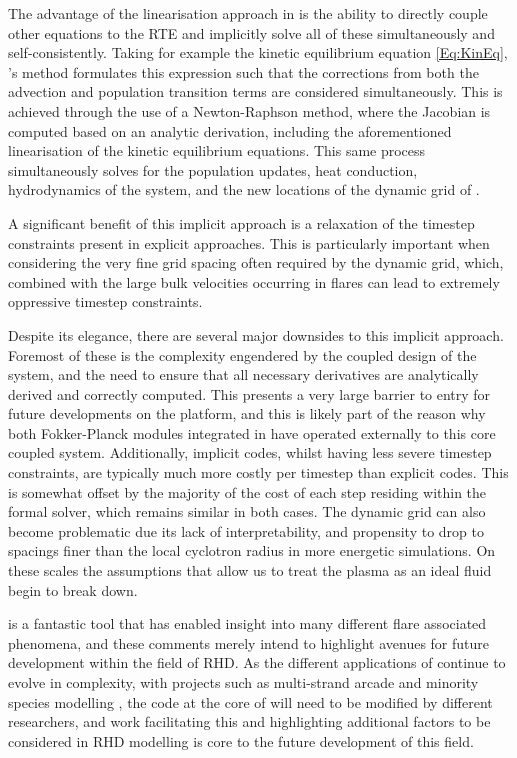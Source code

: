 The advantage of the linearisation approach in \Radyn{} is the ability to directly couple other equations to the RTE and implicitly solve all of these simultaneously and self-consistently.
Taking for example the kinetic equilibrium equation \eqref{Eq:KinEq}, \Radyn{}'s method formulates this expression such that the corrections from both the advection and population transition terms are considered simultaneously.
This is achieved through the use of a Newton-Raphson method, where the Jacobian is computed based on an analytic derivation, including the aforementioned linearisation of the kinetic equilibrium equations.
This same process simultaneously solves for the population updates, heat conduction, hydrodynamics of the system, and the new locations of the dynamic grid of \citet{Dorfi1987}.

A significant benefit of this implicit approach is a relaxation of the timestep constraints present in explicit approaches.
This is particularly important when considering the very fine grid spacing often required by the dynamic grid, which, combined with the large bulk velocities occurring in flares can lead to extremely oppressive timestep constraints.

Despite its elegance, there are several major downsides to this implicit approach.
Foremost of these is the complexity engendered by the coupled design of the system, and the need to ensure that all necessary derivatives are analytically derived and correctly computed.
This presents a very large barrier to entry for future developments on the platform, and this is likely part of the reason why both Fokker-Planck modules integrated in \Radyn{} have operated externally to this core coupled system.
Additionally, implicit codes, whilst having less severe timestep constraints, are typically much more costly per timestep than explicit codes.
This is somewhat offset by the majority of the cost of each step residing within the formal solver, which remains similar in both cases.
The dynamic grid can also become problematic due its lack of interpretability, and propensity to drop to spacings finer than the local cyclotron radius in more energetic simulations.
On these scales the assumptions that allow us to treat the plasma as an ideal fluid begin to break down.

\Radyn{} is a fantastic tool that has enabled insight into many different flare associated phenomena, and these comments merely intend to highlight avenues for future development within the field of RHD.
As the different applications of \Radyn{} continue to evolve in complexity, with projects such as multi-strand arcade and minority species modelling \NeedRef{}, the code at the core of \Radyn{} will need to be modified by different researchers, and work facilitating this and highlighting additional factors to be considered in RHD modelling is core to the future development of this field.

